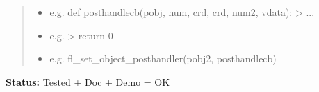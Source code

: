 \begin{boxedminipage}{\funcwidth}
\begin{quote}
\begin{itemize}
  \item
    \setlength{\parskip}{0.6ex}

e.g. def posthandlecb(pobj, num, crd, crd, num2, vdata): > ...


  \item 
e.g. > return 0


  \item 
e.g. fl\_set\_object\_posthandler(pobj2, posthandlecb)


\end{itemize}

\end{quote}

\textbf{Status:} 
Tested + Doc + Demo = OK


    \end{boxedminipage}

    \label{xformslib:flbasic:fl_set_object_callback}

    \vspace{0.5ex}

